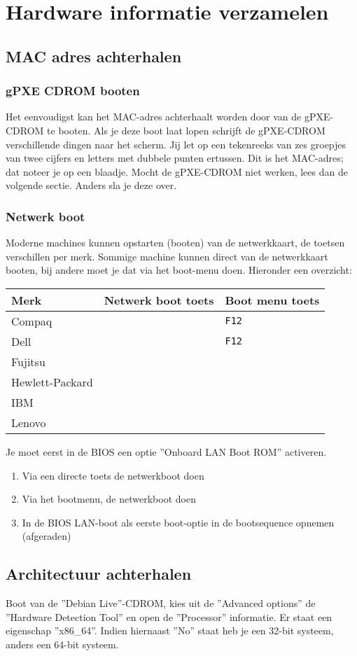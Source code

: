 \section{Hardware informatie verzamelen}
\subsection{MAC adres achterhalen}
\subsubsection{gPXE CDROM booten}
Het eenvoudigst kan het MAC-adres achterhaalt worden door van de gPXE-CDROM te booten. Als je deze boot laat lopen schrijft de gPXE-CDROM verschillende dingen naar het scherm. Jij let op een tekenreeks van zes groepjes van twee cijfers en letters met dubbele punten ertussen. Dit is het MAC-adres; dat noteer je op een blaadje. Mocht de gPXE-CDROM niet werken, lees dan de volgende sectie. Anders sla je deze over.
\subsubsection{Netwerk boot}
Moderne machines kunnen opstarten (booten) van de netwerkkaart, de toetsen verschillen per merk. Sommige machine kunnen direct van de netwerkkaart booten, bij andere moet je dat via het boot-menu doen. Hieronder een overzicht:
\begin{table}[H]
	\begin{tabular}{| l | l |  l |}
	\hline 
	\textbf{Merk} & \textbf{Netwerk boot toets} & \textbf{Boot menu toets}\\
	\hline
	Compaq &  & \texttt{F12}\\
	\hline
	Dell &  & \texttt{F12} \\
	\hline
	Fujitsu &  & \\
	\hline
	Hewlett-Packard &   & \\
	\hline
	IBM &   & \\
	\hline
	Lenovo &  &  \\
	\hline
\end{tabular}
\end{table}
Je moet eerst in de BIOS een optie ''Onboard LAN Boot ROM'' activeren.
\begin{enumerate}
	\item{Via een directe toets de netwerkboot doen}
	\item{Via het bootmenu, de netwerkboot doen}
	\item{In de BIOS LAN-boot als eerste boot-optie in de bootsequence opnemen (afgeraden)}
\end{enumerate}
\subsection{Architectuur achterhalen}
Boot van de ''Debian Live''-CDROM, kies uit de ''Advanced options'' de ''Hardware Detection Tool'' en open de ''Processor'' informatie.
Er staat een eigenschap ''x86\_64''. Indien hiernaast ''No'' staat heb je een 32-bit systeem, anders een 64-bit systeem.
